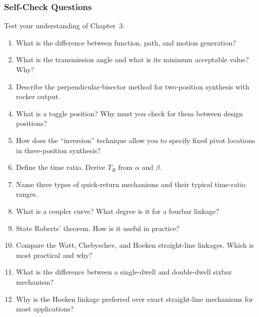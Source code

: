 \documentclass[10pt,aspectratio=43]{beamer}
\begin{document}
\begin{frame}
\frametitle{Self-Check Questions}

Test your understanding of Chapter~3:

\begin{enumerate}
  \item What is the difference between function, path, and motion generation?
  \item What is the transmission angle and what is its minimum acceptable value? Why?
  \item Describe the perpendicular-bisector method for two-position synthesis with rocker output.
  \item What is a toggle position? Why must you check for them between design positions?
  \item How does the ``inversion'' technique allow you to specify fixed pivot locations in three-position synthesis?
  \item Define the time ratio. Derive $T_R$ from $\alpha$ and $\beta$.
  \item Name three types of quick-return mechanisms and their typical time-ratio ranges.
  \item What is a coupler curve? What degree is it for a fourbar linkage?
  \item State Roberts' theorem. How is it useful in practice?
  \item Compare the Watt, Chebyschev, and Hoeken straight-line linkages. Which is most practical and why?
  \item What is the difference between a single-dwell and double-dwell sixbar mechanism?
  \item Why is the Hoeken linkage preferred over exact straight-line mechanisms for most applications?
\end{enumerate}
\end{frame}
\end{document}
